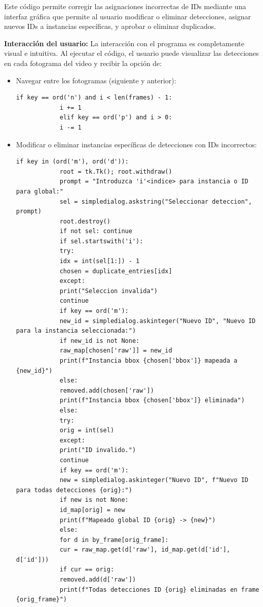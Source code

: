 \documentclass[12pt, a4paper, twoside]{article}
\begin{document}
	Este código permite corregir las asignaciones incorrectas de IDs mediante una interfaz gráfica que permite al usuario modificar o eliminar detecciones, asignar nuevos IDs a instancias específicas, y aprobar o eliminar duplicados.
	
	\textbf{Interacción del usuario:} La interacción con el programa es completamente visual e intuitiva. Al ejecutar el código, el usuario puede visualizar las detecciones en cada fotograma del video y recibir la opción de:
	
	\begin{itemize}
		\item Navegar entre los fotogramas (siguiente y anterior):
		\vspace{0.5cm}
		\begin{lstlisting}[style=pythonstyle]
			if key == ord('n') and i < len(frames) - 1:
			i += 1
			elif key == ord('p') and i > 0:
			i -= 1
		\end{lstlisting}
		
		\item Modificar o eliminar instancias específicas de detecciones con IDs incorrectos:
		\vspace{0.5cm}
		\begin{lstlisting}[style=pythonstyle]
			if key in (ord('m'), ord('d')):
			root = tk.Tk(); root.withdraw()
			prompt = "Introduzca 'i'<indice> para instancia o ID para global:"
			sel = simpledialog.askstring("Seleccionar deteccion", prompt)
			root.destroy()
			if not sel: continue
			if sel.startswith('i'):
			try:
			idx = int(sel[1:]) - 1
			chosen = duplicate_entries[idx]
			except:
			print("Seleccion invalida")
			continue
			if key == ord('m'):
			new_id = simpledialog.askinteger("Nuevo ID", "Nuevo ID para la instancia seleccionada:")
			if new_id is not None:
			raw_map[chosen['raw']] = new_id
			print(f"Instancia bbox {chosen['bbox']} mapeada a {new_id}")
			else:
			removed.add(chosen['raw'])
			print(f"Instancia bbox {chosen['bbox']} eliminada")
			else:
			try:
			orig = int(sel)
			except:
			print("ID invalido.")
			continue
			if key == ord('m'):
			new = simpledialog.askinteger("Nuevo ID", f"Nuevo ID para todas detecciones {orig}:")
			if new is not None:
			id_map[orig] = new
			print(f"Mapeado global ID {orig} -> {new}")
			else:
			for d in by_frame[orig_frame]:
			cur = raw_map.get(d['raw'], id_map.get(d['id'], d['id']))
			if cur == orig:
			removed.add(d['raw'])
			print(f"Todas detecciones ID {orig} eliminadas en frame {orig_frame}")
		\end{lstlisting}
		

\end{itemize}
\end{document}
